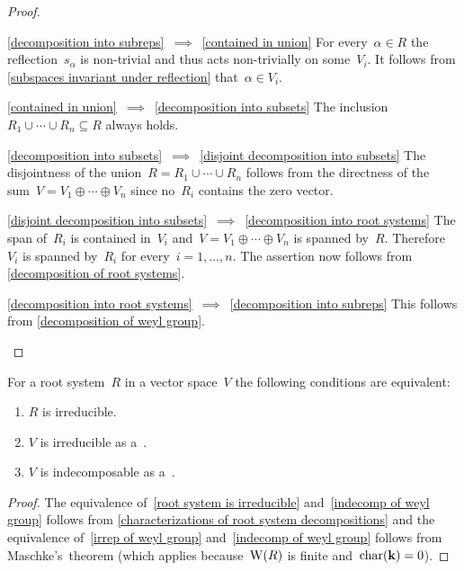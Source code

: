 \begin{proof}
  \leavevmode
  \begin{implicationlist}
    \item[\ref*{decomposition into subreps}~$\implies$~\ref*{contained in union}]
      For every~$\alpha \in R$ the reflection~$s_\alpha$ is non-trivial and thus acts non-trivially on some~$V_i$.
      It follows from \cref{subspaces invariant under reflection} that~$\alpha \in V_i$.
    \item[\ref*{contained in union}~$\implies$~\ref*{decomposition into subsets}]
      The inclusion~$R_1 \cup \dotsb \cup R_n \subseteq R$ always holds.
    \item[\ref*{decomposition into subsets}~$\implies$~\ref*{disjoint decomposition into subsets}]
      The disjointness of the union~$R = R_1 \cup \dotsb \cup R_n$ follows from the directness of the sum~$V = V_1 \oplus \dotsb \oplus V_n$ since no~$R_i$ contains the zero vector.
    \item[\ref*{disjoint decomposition into subsets}~$\implies$~\ref*{decomposition into root systems}]
      The span of~$R_i$ is contained in~$V_i$ and~$V = V_1 \oplus \dotsb \oplus V_n$ is spanned by~$R$.
      Therefore~$V_i$ is spanned by~$R_i$ for every~$i = 1, \dotsc, n$.
      The assertion now follows from \cref{decomposition of root systems}.
    \item[\ref*{decomposition into root systems}~$\implies$~\ref*{decomposition into subreps}]
      This follows from \cref{decomposition of weyl group}.
    \qedhere
  \end{implicationlist}
\end{proof}


\begin{corollary}
  For a root system~$R$ in a vector space~$V$ the following conditions are equivalent:
  \begin{enumerate}
    \item
      \label{root system is irreducible}
      $R$ is irreducible.
    \item
      \label{irrep of weyl group}
      $V$ is irreducible as a~{}.
    \item
      \label{indecomp of weyl group}
      $V$ is indecomposable as a~{}.
  \end{enumerate}
\end{corollary}


\begin{proof}
  The equivalence of~\ref*{root system is irreducible} and~\ref*{indecomp of weyl group} follows from \cref{characterizations of root system decompositions} and the equivalence of~\ref*{irrep of weyl group} and~\ref*{indecomp of weyl group} follows from Maschke’s~theorem (which applies because~$\operatorname{W}(R)$ is finite and~$\operatorname{char}(\mathbf{k}) = 0$).
\end{proof}


